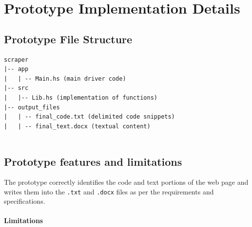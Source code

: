 \documentclass{scrreprt}
\begin{document}
\chapter{Prototype Implementation Details}

\section{Prototype File Structure}

\begin{verbatim}
scraper
|-- app
|   | -- Main.hs (main driver code)
|-- src
|   |-- Lib.hs (implementation of functions)
|-- output_files
|   | -- final_code.txt (delimited code snippets)
|   | -- final_text.docx (textual content)


\end{verbatim}



\section{Prototype features and limitations}

The prototype correctly identifies the code and text portions of the web page and writes them into the \texttt{.txt} and \texttt{.docx} files as per the requirements and specifications. 

\subsubsection{Limitations}
\end{document}
